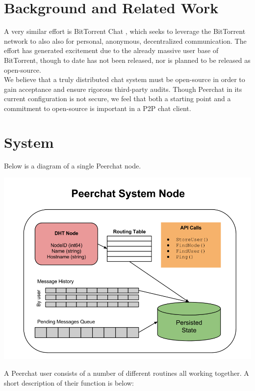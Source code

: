 \documentclass{article}
\begin{document}
\section{Background and Related Work}

A very similar effort is BitTorrent Chat \cite{Goldoor13}, which seeks to leverage the BitTorrent network to also also for personal, anonymous, decentralized communication. The effort has generated excitement due to the already massive user base of BitTorrent, though to date has not been released, nor is planned to be released as open-source. \\

We believe that a truly distributed chat system must be open-source in order to gain acceptance and ensure rigorous third-party audits. Though Peerchat in its current configuration is not secure, we feel that both a starting point and a commitment to open-source is important in a P2P chat client. 

\section{System}

Below is a diagram of a single Peerchat node. 

\includegraphics[scale=0.5]{peerchat}

A Peerchat user consists of a number of different routines all working together. A short description of their function is below: \\
\end{document}

